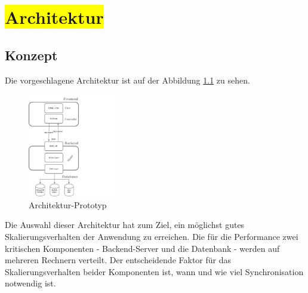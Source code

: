 \chapter{\colorbox{yellow}{Architektur}}

\section{Konzept}

Die vorgeschlagene Architektur ist auf der Abbildung \ref{img:architectureMyApp} zu sehen.


\begin{figure}[H]
\centering
\includegraphics[trim = 0mm 0mm 0mm 0mm, clip, width=0.35\textwidth]{resources/architectureMyAppWithoutFrameworks}
\caption[Architektur-Prototyp]{Architektur-Prototyp}
\label{img:architectureMyApp}
\end{figure}

Die Auswahl dieser Architektur hat zum Ziel, ein möglichst gutes Skalierungsverhalten der Anwendung zu erreichen. Die für die Performance zwei kritischen Komponenten - Backend-Server und die Datenbank - werden auf mehreren Rechnern verteilt. Der entscheidende Faktor für das Skalierungsverhalten beider Komponenten ist, wann und wie viel Synchronisation notwendig ist. 

